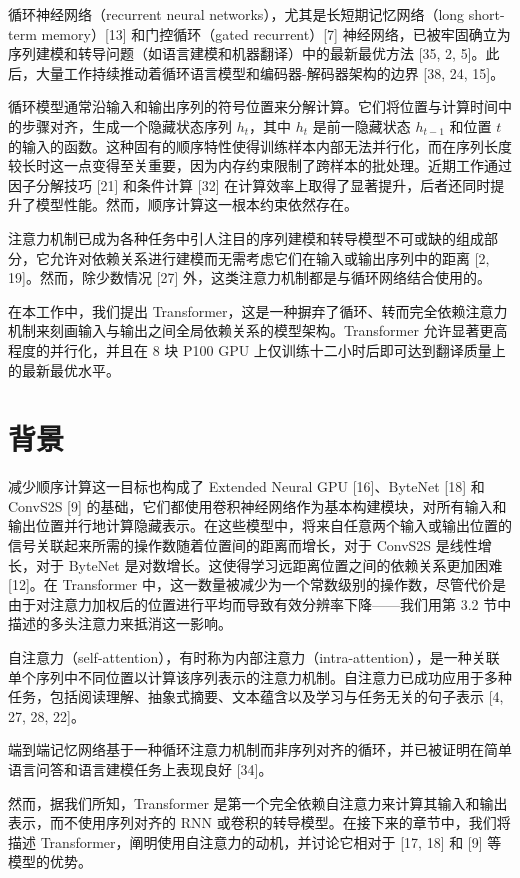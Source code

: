 \documentclass[11pt,UTF8,fontset=fandol]{ctexart}
\begin{document}
循环神经网络（recurrent neural networks），尤其是长短期记忆网络（long short-term memory）[13] 和门控循环（gated recurrent）[7] 神经网络，已被牢固确立为序列建模和转导问题（如语言建模和机器翻译）中的最新最优方法 [35, 2, 5]。此后，大量工作持续推动着循环语言模型和编码器-解码器架构的边界 [38, 24, 15]。

循环模型通常沿输入和输出序列的符号位置来分解计算。它们将位置与计算时间中的步骤对齐，生成一个隐藏状态序列 $h_t$，其中 $h_t$ 是前一隐藏状态 $h_{t-1}$ 和位置 $t$ 的输入的函数。这种固有的顺序特性使得训练样本内部无法并行化，而在序列长度较长时这一点变得至关重要，因为内存约束限制了跨样本的批处理。近期工作通过因子分解技巧 [21] 和条件计算 [32] 在计算效率上取得了显著提升，后者还同时提升了模型性能。然而，顺序计算这一根本约束依然存在。

注意力机制已成为各种任务中引人注目的序列建模和转导模型不可或缺的组成部分，它允许对依赖关系进行建模而无需考虑它们在输入或输出序列中的距离 [2, 19]。然而，除少数情况 [27] 外，这类注意力机制都是与循环网络结合使用的。

在本工作中，我们提出 Transformer，这是一种摒弃了循环、转而完全依赖注意力机制来刻画输入与输出之间全局依赖关系的模型架构。Transformer 允许显著更高程度的并行化，并且在 8 块 P100 GPU 上仅训练十二小时后即可达到翻译质量上的最新最优水平。

\section{背景}

减少顺序计算这一目标也构成了 Extended Neural GPU [16]、ByteNet [18] 和 ConvS2S [9] 的基础，它们都使用卷积神经网络作为基本构建模块，对所有输入和输出位置并行地计算隐藏表示。在这些模型中，将来自任意两个输入或输出位置的信号关联起来所需的操作数随着位置间的距离而增长，对于 ConvS2S 是线性增长，对于 ByteNet 是对数增长。这使得学习远距离位置之间的依赖关系更加困难 [12]。在 Transformer 中，这一数量被减少为一个常数级别的操作数，尽管代价是由于对注意力加权后的位置进行平均而导致有效分辨率下降——我们用第 3.2 节中描述的多头注意力来抵消这一影响。

自注意力（self-attention），有时称为内部注意力（intra-attention），是一种关联单个序列中不同位置以计算该序列表示的注意力机制。自注意力已成功应用于多种任务，包括阅读理解、抽象式摘要、文本蕴含以及学习与任务无关的句子表示 [4, 27, 28, 22]。

端到端记忆网络基于一种循环注意力机制而非序列对齐的循环，并已被证明在简单语言问答和语言建模任务上表现良好 [34]。

然而，据我们所知，Transformer 是第一个完全依赖自注意力来计算其输入和输出表示，而不使用序列对齐的 RNN 或卷积的转导模型。在接下来的章节中，我们将描述 Transformer，阐明使用自注意力的动机，并讨论它相对于 [17, 18] 和 [9] 等模型的优势。
\end{document}
